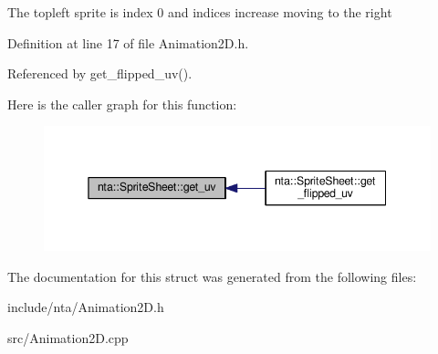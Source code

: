 The topleft sprite is index 0 and indices increase moving to the right 

Definition at line 17 of file Animation2\+D.\+h.



Referenced by get\+\_\+flipped\+\_\+uv().

Here is the caller graph for this function\+:
\nopagebreak
\begin{figure}[H]
\begin{center}
\leavevmode
\includegraphics[width=345pt]{d9/d85/structnta_1_1SpriteSheet_a618bc48e6978a19ad9eb56dda3307f5a_icgraph}
\end{center}
\end{figure}


The documentation for this struct was generated from the following files\+:\begin{DoxyCompactItemize}
\item 
include/nta/Animation2\+D.\+h\item 
src/Animation2\+D.\+cpp\end{DoxyCompactItemize}
